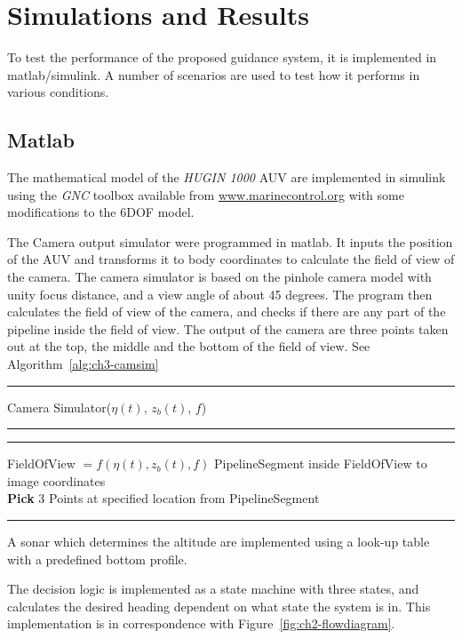 \chapter{Simulations and Results}
	\label{ch3}
	To test the performance of the proposed guidance system, it is implemented in matlab/simulink. A number of
	scenarios are used to test how it performs in various conditions.
	

\section{Matlab}
	The mathematical model of the \textit{HUGIN 1000} AUV are implemented in simulink using the
	\textit{GNC} toolbox available from \url{www.marinecontrol.org} with some modifications to the
	6DOF model.

	The Camera output simulator were programmed in matlab. It inputs the position of the AUV and
	transforms it to body coordinates to calculate the field of view of the camera. The camera simulator is based
	on the pinhole camera model with unity focus distance, and a view angle of about 45 degrees. The
	program then calculates the field of view of the camera, and checks if there are any part of the
	pipeline inside the field of view. The output of the camera are three points taken out at the top, the
	middle and the bottom of the field of view. See Algorithm~\ref{alg:ch3-camsim}
	\begin{algorithm}[htbp]
		\hrule
		\caption{Camera Simulator($\eta(t)$, $z_b(t)$, $f$)}
		\label{alg:ch3-camsim}
		\hrule
		\hrule\vspace{\onelineskip}
		\begin{algorithmic}
			\STATE FieldOfView $= f(\eta(t), z_b(t), f)$
				 PipelineSegment inside FieldOfView to image coordinates\\
				\textbf{Pick} 3 Points at specified location from PipelineSegment\\
			\ELSE{}
			\ENDIF
		\end{algorithmic}
		\vspace{\onelineskip}\hrule
		\vspace{0.2pt}
	\end{algorithm}

	A sonar which determines the altitude are implemented using a look-up table with a predefined bottom
	profile.

	The decision logic is implemented as a state machine with three states, and calculates the  
	desired heading dependent on what state the system is in. This implementation is in correspondence
	with  Figure~\ref{fig:ch2-flowdiagram}.

